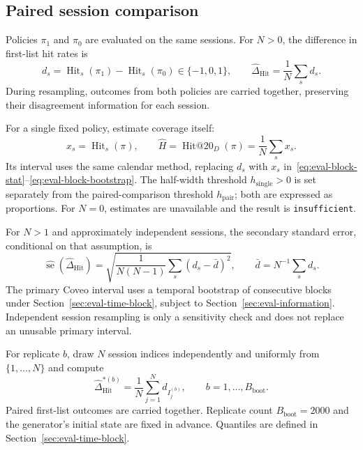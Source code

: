 \documentclass[12pt,a4paper]{article}
\newcommand{\code}[1]{{\ttfamily\small\nolinkurl{#1}}}
\theoremstyle{plainru}
\begin{document}
\subsection{Paired session comparison}\label{sec:eval-paired}

Policies $\pi_1$ and $\pi_0$ are evaluated on the same sessions.
For $N>0$, the difference in first-list hit rates is
\begin{equation}\label{eq:eval-paired-diff}
 d_s=\operatorname{Hit}_s(\pi_1)-\operatorname{Hit}_s(\pi_0)\in\{-1,0,1\},\qquad
 \widehat\Delta_{\mathrm{Hit}}=
          \frac{1}{N}\sum_s d_s.
\end{equation}
During resampling, outcomes from both policies are carried together,
preserving their disagreement information for each session.

For a single fixed policy, estimate coverage itself:
\begin{equation}\label{eq:eval-single-policy}
x_s=\operatorname{Hit}_s(\pi),\qquad
\widehat H=\operatorname{Hit@20}_D(\pi)=\frac{1}{N}\sum_s x_s.
\end{equation}
Its interval uses the same calendar method, replacing $d_s$ with $x_s$
in~\eqref{eq:eval-block-stat}--\eqref{eq:eval-block-bootstrap}.
The half-width threshold $h_{\mathrm{single}}>0$ is set separately from
the paired-comparison threshold $h_{\mathrm{pair}}$; both are expressed as proportions.
For $N=0$, estimates are unavailable and the result is \code{insufficient}.

For $N>1$ and approximately independent sessions, the secondary standard error,
conditional on that assumption, is
\begin{equation}\label{eq:eval-paired-se}
 \widehat{\operatorname{se}}(\widehat\Delta_{\mathrm{Hit}})
 =\sqrt{\frac{1}{N(N-1)}
       \sum_s(d_s-\bar d)^2},\qquad
 \bar d=N^{-1}\sum_s d_s.
\end{equation}
The primary Coveo interval uses a temporal bootstrap of consecutive
blocks under Section~\ref{sec:eval-time-block}, subject to
Section~\ref{sec:eval-information}. Independent session resampling
\cite{bootstrap} is only a sensitivity check and does not replace
an unusable primary interval.

For replicate $b$, draw $N$ session indices independently and uniformly
from $\{1,\ldots,N\}$ and compute
\begin{equation}\label{eq:eval-bootstrap}
 \widehat\Delta_{\mathrm{Hit}}^{*(b)}
 =\frac{1}{N}\sum_{j=1}^{N}d_{I_j^{(b)}},
 \qquad b=1,\ldots,B_{\mathrm{boot}}.
\end{equation}
Paired first-list outcomes are carried together. Replicate count
$B_{\mathrm{boot}}=2000$ and the generator's initial state are fixed
in advance. Quantiles are defined in Section~\ref{sec:eval-time-block}.
\end{document}

